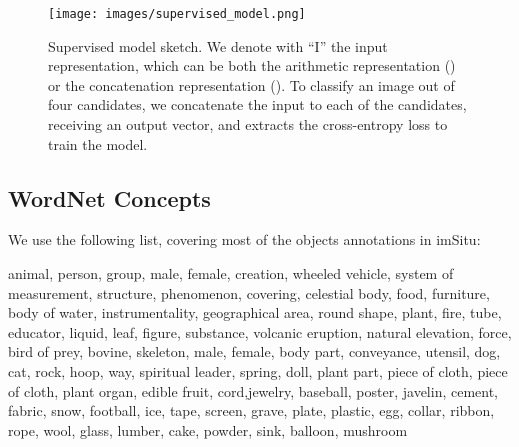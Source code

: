 \documentclass[letterpaper]{article} \usepackage{aaai23}  \usepackage{times}  \usepackage{helvet}  \usepackage{courier}  \usepackage[hyphens]{url}  \usepackage{graphicx} \urlstyle{rm} \def\UrlFont{\rm}  \usepackage{natbib}  \usepackage{caption} \frenchspacing  \setlength{\pdfpagewidth}{8.5in}  \setlength{\pdfpageheight}{11in}  \usepackage{algorithm}
\begin{document}
\begin{figure}[!h]
\centering
\newcommand{\figlen}[0]{\columnwidth}
    \texttt{[image: images/supervised\_model.png]}\\
    \caption{Supervised model sketch. We denote with ``I'' the input representation, which can be both the arithmetic representation () or the concatenation representation (). To classify an image out of four candidates, we concatenate the input to each of the candidates, receiving an output vector, and extracts the cross-entropy loss to train the model.}
    \label{fig:supervised_model}
\end{figure}

\subsection{WordNet Concepts}
We use the following list, covering most of the objects annotations in imSitu:

animal, person, group, male, female, creation, wheeled vehicle, system of measurement, structure, phenomenon, covering, celestial body, food, furniture, body of water, instrumentality, geographical area, round shape, plant, fire, tube, educator, liquid, leaf, figure, substance, volcanic eruption, natural elevation, force, bird of prey, bovine, skeleton, male, female, body part, conveyance, utensil, dog, cat, rock, hoop, way, spiritual leader, spring, doll, plant part, piece of cloth, piece of cloth, plant organ, edible fruit, cord,jewelry, baseball, poster, javelin, cement, fabric, snow, football, ice, tape, screen, grave, plate, plastic, egg, collar, ribbon, rope, wool, glass, lumber, cake, powder, sink, balloon, mushroom
\end{document}
